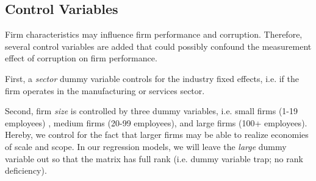 
\subsection{Control Variables}
Firm characteristics may influence firm performance and corruption. Therefore, several control variables are added that could possibly confound the measurement effect of corruption on firm performance. 

First, a \textit{sector} dummy variable controls for the industry fixed effects, i.e. if the firm operates in the manufacturing or services sector.

Second, firm \textit{size} is controlled by three dummy variables, i.e. small firms (1-19 employees) , medium firms (20-99 employees), and large firms (100+ employees). Hereby, we control for the fact that larger firms may be able to realize economies of scale and scope. In our regression models, we will leave the \textit{large} dummy variable out so that the matrix has full rank (i.e. dummy variable trap; no rank deficiency). 

